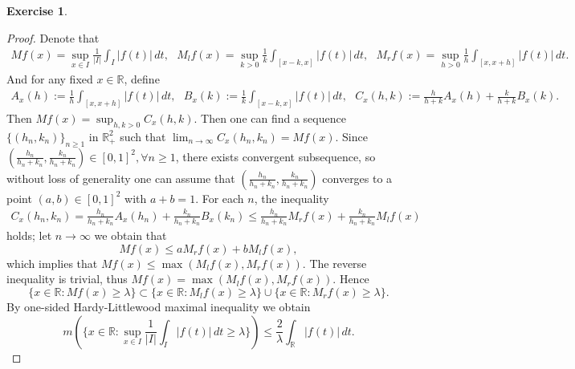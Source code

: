 \documentclass[a4paper]{article}
\newtheorem{ex}{Exercise}[subsection]
\begin{document}
\begin{ex}\end{ex}\begin{proof}
Denote that \begin{align*}
Mf(x) = \sup_{x\in I} \frac{1}{|I|}\int_I |f(t)|\,dt,\ \ \ M_lf(x) = \sup_{k > 0}\frac{1}{k}\int_{[x - k, x]}
|f(t)|\,dt,\ \ \ M_rf(x) = \sup_{h > 0}\frac{1}{h}\int_{[x, x + h]}|f(t)|\,dt.
\end{align*}And for any fixed $x \in \mathbb{R}$, define\begin{align*}
A_x(h) := \frac{1}{h}\int_{[x, x + h]}|f(t)|\,dt,\ \ \ B_x(k) := \frac{1}{k}\int_{[x - k, x]}|f(t)|\,dt,\ \ \ 
C_x(h, k) := \frac{h}{h + k}A_x(h) + \frac{k}{h + k}B_x(k).
\end{align*}
Then $Mf(x) = \sup_{h, k > 0}C_x(h, k)$. Then one can find a sequence $\{(h_n, k_n)\}_{n \geq 1}$ in $\mathbb{R}_+^2$
such that $\lim_{n \to \infty} C_x(h_n, k_n) = Mf(x)$. Since $(\frac{h_n}{h_n + k_n}, \frac{k_n}{h_n + k_n}) \in [0,1]^2, \forall n \geq 1$, there exists
convergent subsequence, so without loss of generality one can assume that $(\frac{h_n}{h_n + k_n}, \frac{k_n}{h_n + k_n})$ 
converges to a point $(a, b) \in [0,1]^2$ with $a + b = 1$. For each $n$, the inequality\begin{align*}
C_x(h_n, k_n) = \frac{h_n}{h_n + k_n}A_x(h_n) + \frac{k_n}{h_n + k_n}B_x(k_n) \leq 
\frac{h_n}{h_n + k_n}M_rf(x) + \frac{k_n}{h_n + k_n}M_lf(x)
\end{align*}holds; let $n \to \infty$ we obtain that $$
Mf(x) \leq aM_rf(x) + bM_lf(x),
$$which implies that $Mf(x) \leq \max(M_lf(x), M_rf(x))$. The reverse inequality is trivial, thus $Mf(x) = \max(M_lf(x), M_rf(x))$.
Hence $$
\{x \in \mathbb{R} : Mf(x) \geq \lambda\} \subset \{x \in \mathbb{R} : M_lf(x) \geq \lambda\} \cup \{x \in \mathbb{R} : M_rf(x) \geq \lambda\}.
$$By one-sided Hardy-Littlewood maximal inequality we obtain$$
m(\{x \in \mathbb{R} : \sup_{x\in I} \frac{1}{|I|}\int_I |f(t)|\,dt \geq \lambda\}) \leq \frac{2}{\lambda} \int_\mathbb{R}|f(t)|\,dt.
$$
\end{proof}
\end{document}
